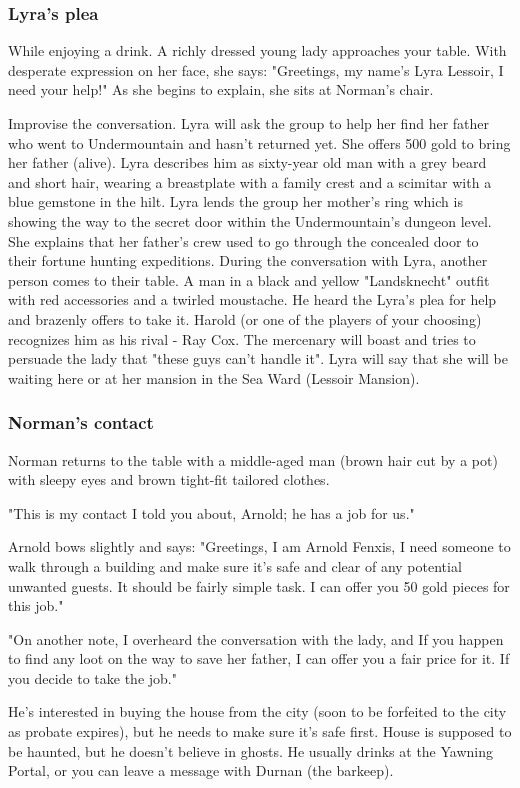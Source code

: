 \documentclass[10pt,onecolumn,twoside,openany,bg=full,layout=true]{dndbook}
\begin{document}
\subsubsection{Lyra's plea}
\begin{DndReadAloud}
  While enjoying a drink.
  A richly dressed young lady approaches your table.
  With desperate expression on her face, she says:
  "Greetings, my name's Lyra Lessoir, I need your help!"
  As she begins to explain, she sits at Norman's chair.
\end{DndReadAloud}
Improvise the conversation.
Lyra will ask the group to help her find her father who went to Undermountain and hasn't returned yet.
She offers 500 gold to bring her father (alive).
Lyra describes him as sixty-year old man with a grey beard and short hair, wearing a breastplate with a family crest and a scimitar with a blue gemstone in the hilt.
Lyra lends the group her mother's ring which is showing the way to the secret door within the Undermountain's dungeon level.
She explains that her father's crew used to go through the concealed door to their fortune hunting expeditions.
During the conversation with Lyra, another person comes to their table.
A man in a black and yellow "Landsknecht" outfit with red accessories and a twirled moustache.
He heard the Lyra's plea for help and brazenly offers to take it.
Harold (or one of the players of your choosing) recognizes him as his rival - Ray Cox.
The mercenary will boast and tries to persuade the lady that "these guys can't handle it".
Lyra will say that she will be waiting here or at her mansion in the Sea Ward (Lessoir Mansion).

\subsubsection{Norman's contact}
\begin{DndReadAloud}
  Norman returns to the table with a middle-aged man (brown hair cut by a pot) with sleepy eyes and brown tight-fit tailored clothes.

  "This is my contact I told you about, Arnold; he has a job for us."

  Arnold bows slightly and says:
  "Greetings, I am Arnold Fenxis, I need someone to walk through a building and make sure it's safe and clear of any potential unwanted guests.
  It should be fairly simple task.
  I can offer you 50 gold pieces for this job."

  "On another note, I overheard the conversation with the lady, and If you happen to find any loot on the way to save her father, I can offer you a fair price for it.
  If you decide to take the job."
\end{DndReadAloud}
He's interested in buying the house from the city (soon to be forfeited to the city as probate expires), but he needs to make sure it's safe first.
House is supposed to be haunted, but he doesn't believe in ghosts.
He usually drinks at the Yawning Portal, or you can leave a message with Durnan (the barkeep).
\end{document}
